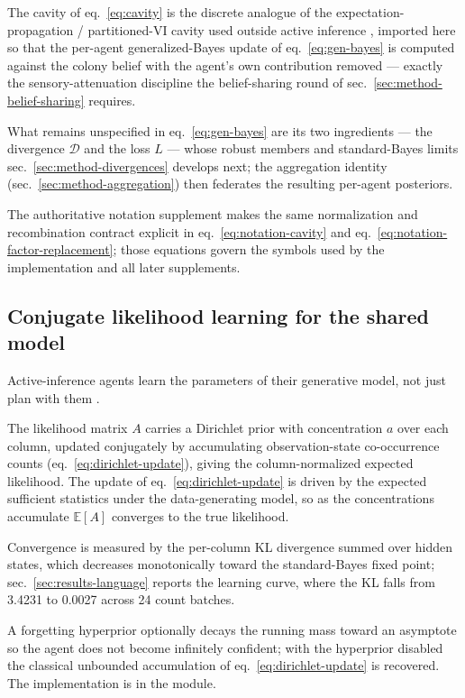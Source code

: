 \documentclass[
  english,
]{article}
\theoremstyle{plain}
\theoremstyle{definition}
\theoremstyle{remark}
\theoremstyle{definition}
\begin{document}
The cavity of eq.~\ref{eq:cavity} is the discrete analogue of the
expectation- propagation / partitioned-VI cavity used outside active
inference \citep{ashman2022partitioned, bui2018partitioned}, imported
here so that the per-agent generalized-Bayes update of
eq.~\ref{eq:gen-bayes} is computed against the colony belief with the
agent's own contribution removed --- exactly the sensory-attenuation
discipline the belief-sharing round of
sec.~\ref{sec:method-belief-sharing} requires.

What remains unspecified in eq.~\ref{eq:gen-bayes} are its two
ingredients --- the divergence \(\mathcal D\) and the loss \(L\) ---
whose robust members and standard-Bayes limits
sec.~\ref{sec:method-divergences} develops next; the aggregation
identity (sec.~\ref{sec:method-aggregation}) then federates the
resulting per-agent posteriors.

The authoritative notation supplement makes the same normalization and
recombination contract explicit in eq.~\ref{eq:notation-cavity} and
eq.~\ref{eq:notation-factor-replacement}; those equations govern the
symbols used by the implementation and all later supplements.

\subsection{Conjugate likelihood learning for the shared
model}\label{sec:method-learning}

Active-inference agents learn the parameters of their generative model,
not just plan with them \citep{smith2020active, friston2024federated}.

The likelihood matrix \(A\) carries a Dirichlet prior with concentration
\(a\) over each column, updated conjugately by accumulating
observation-state co-occurrence counts (eq.~\ref{eq:dirichlet-update}),
giving the column-normalized expected likelihood. The update of
eq.~\ref{eq:dirichlet-update} is driven by the expected sufficient
statistics under the data-generating model, so as the concentrations
accumulate \(\mathbb{E}[A]\) converges to the true likelihood.

Convergence is measured by the per-column KL divergence summed over
hidden states, which decreases monotonically toward the standard-Bayes
fixed point; sec.~\ref{sec:results-language} reports the learning curve,
where the KL falls from 3.4231 to 0.0027 across 24 count batches.

A forgetting hyperprior optionally decays the running mass toward an
asymptote so the agent does not become infinitely confident; with the
hyperprior disabled the classical unbounded accumulation of
eq.~\ref{eq:dirichlet-update} is recovered. The implementation is
 in the  module.
\end{document}
